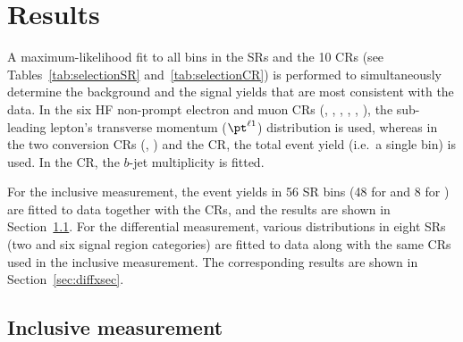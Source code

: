 \documentclass[cernpreprint, atlasdraft=false, texlive=2023, UKenglish, texmf, orcidlogo]{atlasdoc}
\begin{document}

 
\section{Results}
\label{sec:results}

 
A maximum-likelihood fit to all bins in the SRs and the 10 CRs (see Tables~\ref{tab:selectionSR} and~\ref{tab:selectionCR})
is performed to simultaneously determine the background and the \ttW signal yields that are most consistent with the data.
In the six HF non-prompt electron and muon CRs
(\llttetm, \llttemt, \llttemm, \llttmutm, \llttmumt, \llttmumm),
the sub-leading lepton's transverse momentum ($\pt^{\ell1}$) distribution is used, whereas in the two conversion CRs
(\lllintc, \lllmatc) and the \lllVV CR, the total event yield (i.e.~a single bin) is
used. In the \lllttZ CR, the $b$-jet multiplicity is fitted.
 
For the inclusive \ttW \xs measurement, the event yields in 56 SR bins (48 for \llSS and 8 for \lll) are fitted to data together with the CRs, and the results are shown in Section~\ref{sec:inclxsec}.
For the differential \ttW \xs measurement, various distributions in eight SRs (two \llSS and six \lll signal region categories) are fitted to data along with the same CRs used in the inclusive measurement. The corresponding results are shown in Section~\ref{sec:diffxsec}.
 
 
 
 
\subsection{Inclusive \xs measurement}
\label{sec:inclxsec}
 

 
\end{document}
